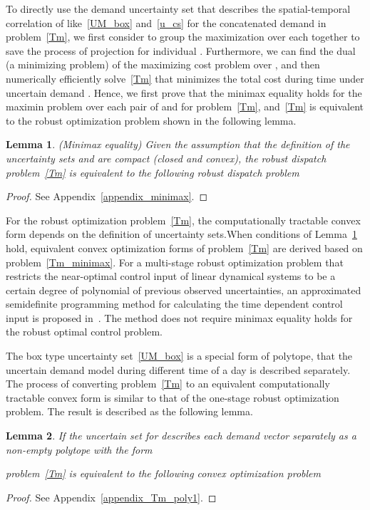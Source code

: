 \documentclass[10pt,twocolumn,twoside,english]{IEEEtran}
\newtheorem{lemma}{Lemma}
\begin{document}
To directly use the demand uncertainty set that describes the spatial-temporal correlation of  like~\eqref{UM_box} and~\eqref{u_cs} for the concatenated demand  in problem~\eqref{Tm}, we first consider to group the maximization over each  together to save the process of projection  for individual . Furthermore, we can find the dual (a minimizing problem) of the maximizing cost problem over , and then numerically efficiently solve~\eqref{Tm} that minimizes the total cost during time  under uncertain demand . Hence, we first prove that the minimax equality holds for the maximin problem over each pair of  and  for problem~\eqref{Tm}, and~\eqref{Tm} is equivalent to the robust optimization problem shown in the following lemma. \begin{lemma}(Minimax equality)
Given the assumption that the definition of the uncertainty sets  and  are compact (closed and convex), the robust dispatch problem~\eqref{Tm} is equivalent to the following robust dispatch problem

\label{lemma_minimax}
\end{lemma}
\begin{proof}
See Appendix~\ref{appendix_minimax}.
\end{proof}

For the robust optimization problem~\eqref{Tm}, the computationally tractable convex form depends on the definition of uncertainty sets.When conditions of Lemma~\ref{lemma_minimax} hold, equivalent convex optimization forms of problem~\eqref{Tm} are derived based on problem~\eqref{Tm_minimax}. For a multi-stage robust optimization problem that restricts the near-optimal control input of linear dynamical systems to be a certain degree of polynomial of previous observed uncertainties, an approximated semidefinite programming method for calculating the time dependent control input is proposed in~\cite{multistage}. The method does not require minimax equality holds for the robust optimal control problem.

The box type uncertainty set~\eqref{UM_box} is a special form of polytope, that the uncertain demand model during different time of a day is described separately. The process of converting problem~\eqref{Tm} to an equivalent computationally tractable convex form is similar to that of the one-stage robust optimization problem. The result is described as the following lemma.
\begin{lemma}
If the uncertain set for  describes each demand vector  separately as a non-empty polytope with the form
 
problem~\eqref{Tm} is equivalent to the following convex optimization problem

\label{lemma_Tm_poly}
\end{lemma}
\begin{proof}
See Appendix~\ref{appendix_Tm_poly1}.
\end{proof}
\end{document}

